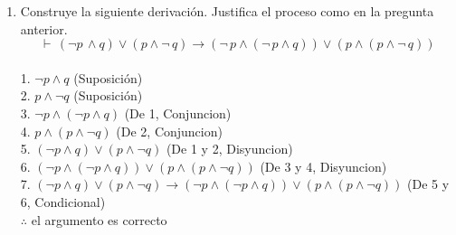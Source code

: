 \documentclass[a4paper,10pt]{article}
\begin{document}
\begin{enumerate}
\begin{multicols}{2}
    Así\\
    1. $\neg$P $\rightarrow$ $(\neg Q \land \neg R)$ (Premisa)\\
    2. S $\rightarrow$ Q (Premisa)\\
    3. $\neg$ P (Premisa)\\
    4.$\therefore$ ¬S
\end{multicols}

Usamos Modus Ponens (MP) en 1 y 3:\\
4. $\neg Q \land \neg R$ (MP 1, 3)\\
Simplificación\\
5. $\neg$Q (Simplificacion 4)\\
Modus Tollens en 2 y 5:\\
6. $\neg$S (MT 2, 5)\\
$\therefore$ Chubaka no es quelite\\

	\vspace{5pt}
		
	\item {}
		Construye la siguiente derivación. Justifica el proceso como en la pregunta anterior.\\
		$$\vdash \, (\neg p \, \land q) \lor (p \land \neg \, q) \to (\neg \, p \land (\neg \, p \land q)) \lor (p \land (p \land \neg \, q))$$\\
1. $\neg p \land q$ (Suposición)\\
2. $p \land \neg q$ (Suposición)\\
3. $\neg p \land (\neg p \land q)$ (De 1, Conjuncion)\\
4. $p \land (p \land \neg q)$ (De 2, Conjuncion)\\
5. $(\neg p \land q) \lor (p \land \neg q)$ (De 1 y 2, Disyuncion)\\
6. $(\neg p \land (\neg p \land q)) \lor (p \land (p \land \neg q))$ (De 3 y 4, Disyuncion)\\
7. $(\neg p \land q) \lor (p \land \neg q) \to (\neg p \land (\neg p \land q)) \lor (p \land (p \land \neg q))$ (De 5 y 6, Condicional)\\

$\therefore$ el argumento es correcto

		
\end{enumerate}
\end{document}
